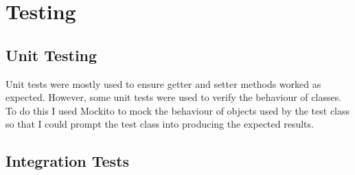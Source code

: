 \section{Testing}
\label{sec:Testing}

\subsection{Unit Testing}
\label{subsec:Unit Testing}
Unit tests were mostly used to ensure getter and setter methods worked as expected. However, some unit tests were used to verify the behaviour of classes. To do this I used Mockito \citep{MockitoWebsite} to mock the behaviour of objects used by the test class so that I could prompt the test class into producing the expected results.

\subsection{Integration Tests}
\label{subsec:Integration Tests}


